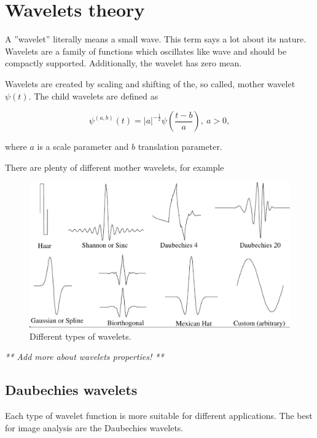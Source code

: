 \chapter{Wavelets theory}
A ''wavelet'' literally means a small wave. This term says a lot about its nature. Wavelets are a family of functions which oscillates like wave and should be compactly supported. Additionally, the wavelet has zero mean.

\begin{defn}
Wavelets are created by scaling and shifting of the, so called, mother wavelet $\psi(t)$. The child wavelets are defined as

\begin{equation}
\label{eq:wavelets}
\psi^{(a,b)}(t)=|a|^{-\frac{1}{2}} \psi\left(\frac{t-b}{a}\right),\ a>0,
\end{equation}

where $a$ is a scale parameter and $b$ translation parameter.

\end{defn}

There are plenty of different mother wavelets, for example

\begin{figure}[h]
	\centering
	\includegraphics[width=\textwidth]{wavelets_with_bottom_line.png}
	\caption{Different types of wavelets.}
	\label{fig:wavelets}
\end{figure}

\textit{** Add more about wavelets properties! **}


\section{Daubechies wavelets}

Each type of wavelet function is more suitable for different applications. The best for image analysis are the Daubechies wavelets. 

